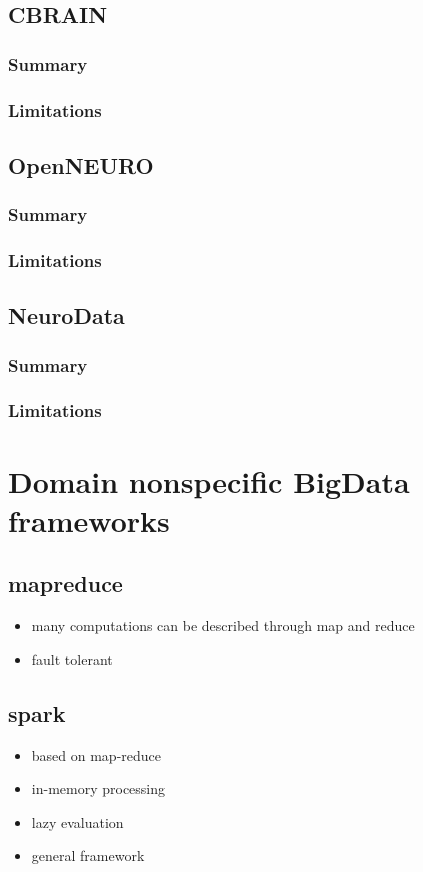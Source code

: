 \documentclass{report}
\begin{document}
	\section{CBRAIN}
		\subsection{Summary}
		\subsection{Limitations}
	\section{OpenNEURO}
		\subsection{Summary}
		\subsection{Limitations}
	\section{NeuroData}
		\subsection{Summary}
		\subsection{Limitations}
\chapter{Domain nonspecific BigData frameworks}
	\section{mapreduce}
		\begin{itemize}
			\item many computations can be described through map and reduce
			\item fault tolerant
		\end{itemize}
	\section{spark}
		\begin{itemize}
			\item based on map-reduce
			\item in-memory processing
			\item lazy evaluation
			\item general framework
		\end{itemize}
\end{document}
